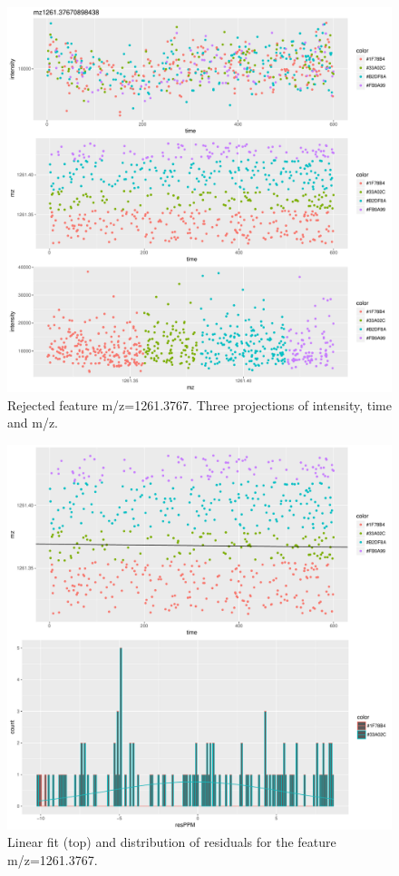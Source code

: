 \documentclass[]{article}
\begin{document}
\begin{figure}[H]
\begin{center}
\includegraphics{Supplementary_document_files/figure-latex/cluster.mz.1261-1.pdf}
\caption{Rejected feature m/z=1261.3767. Three projections of intensity, time and m/z.}
\label{fig:d3.mz.1261.3767}
\end{center}
\end{figure}


\begin{figure}[H]
\begin{center}
\includegraphics{Supplementary_document_files/figure-latex/filter.lm.1261-1.pdf}
\caption{Linear fit (top) and distribution of residuals for the  feature m/z=1261.3767.}
\label{ig:chk.mz.1261.3767}
\end{center}
\end{figure}
\end{document}
